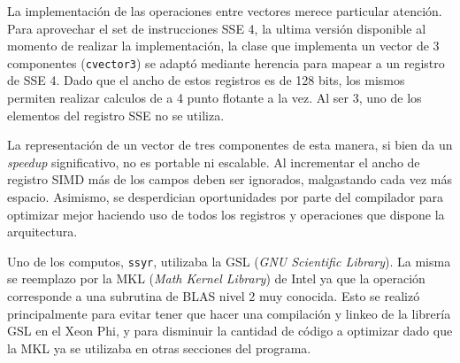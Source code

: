 La implementaci\'on de las operaciones entre vectores merece particular atenci\'on.
Para aprovechar el set de instrucciones SSE 4, la ultima versi\'on disponible al
momento de realizar la implementaci\'on, la clase que implementa un vector de 3
componentes (\texttt{cvector3}) se adapt\'o mediante herencia para mapear a un
registro de SSE 4. Dado que el ancho de estos registros es de 128 bits, los mismos
permiten realizar calculos de a 4 punto flotante a la vez. Al ser 3, uno de los
elementos del registro SSE no se utiliza.

La representaci\'on de un vector de tres componentes de esta manera, si bien da
un \textit{speedup} significativo, no es portable ni escalable. Al incrementar el
ancho de registro SIMD m\'as de los campos deben ser ignorados, malgastando cada
vez m\'as espacio. Asimismo, se desperdician oportunidades por parte del compilador
para optimizar mejor haciendo uso de todos los registros y operaciones que dispone
la arquitectura. 

Uno de los computos, \texttt{ssyr}, utilizaba la GSL (\textit{GNU Scientific Library}).
La misma se reemplazo por la MKL (\textit{Math Kernel Library}) de Intel ya que
la operaci\'on corresponde a una subrutina de BLAS nivel 2 muy conocida. Esto se
realiz\'o principalmente para evitar tener que hacer una compilaci\'on y linkeo
de la librer\'ia GSL en el Xeon Phi, y para disminuir la cantidad de c\'odigo a
optimizar dado que la MKL ya se utilizaba en otras secciones del programa.

